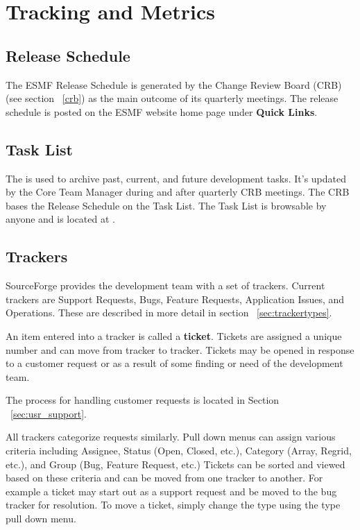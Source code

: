 
\section{Tracking and Metrics}

\subsection{Release Schedule}

The ESMF Release Schedule is generated by the Change Review Board (CRB) (see section ~\ref{crb})
as the main outcome of its quarterly meetings.  The release schedule is posted on the ESMF website home page
under {\bf Quick Links}.

\subsection{Task List}

The  is used
to archive past, current, and future development tasks.  It's updated by the Core Team
Manager during and after quarterly CRB meetings.  The CRB bases the Release Schedule 
on the Task List.  The Task List is browsable by anyone and is located at
.

\subsection{Trackers}
\label{tracking_tools}

SourceForge provides the development team with a set of trackers.  Current trackers are
Support Requests, Bugs, Feature Requests, Application Issues, and Operations.  These are 
described in more detail in section ~\ref{sec:trackertypes}.  

An item entered into a tracker is called a {\bf ticket}. Tickets are assigned a unique
number and can move from tracker to tracker. Tickets may be opened in response to a customer
request or as a result of some finding or need of the development team.

The process for handling customer requests is located in Section ~\ref{sec:usr_support}.

All trackers categorize requests similarly. Pull down menus can assign various criteria
including Assignee, Status (Open, Closed, etc.), Category (Array, Regrid, etc.), and Group
(Bug, Feature Request, etc.)  Tickets can be sorted and viewed based on these criteria and
can be moved from one tracker to another. For example a ticket may start out as a support
request and be moved to the bug tracker for resolution.  To move a ticket, simply change
the type using the type pull down menu. 

